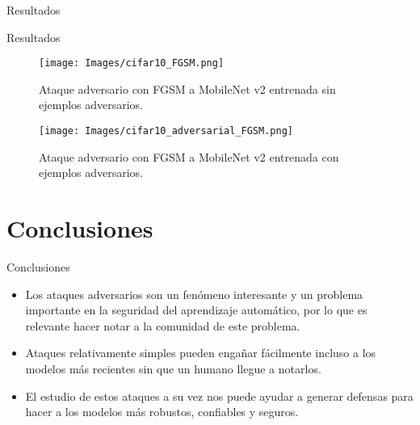 \documentclass[10pt]{beamer}
\begin{document}
\begin{frame}{Resultados}
\end{frame}

\begin{frame}{Resultados}
\justify	
\small

\begin{figure}[H]
\centering
\texttt{[image: Images/cifar10\_FGSM.png]}
\caption{Ataque adversario con FGSM a MobileNet v2 entrenada sin ejemplos adversarios.}
\end{figure}

\begin{figure}[H]
\centering
\texttt{[image: Images/cifar10\_adversarial\_FGSM.png]}
\caption{Ataque adversario con FGSM a MobileNet v2 entrenada con ejemplos adversarios.}
\end{figure}

\end{frame}

\section{Conclusiones}
\begin{frame}{Conclusiones}
\justify	
\small

\begin{itemize}
\item Los ataques adversarios son un fenómeno interesante y un problema importante en la seguridad del aprendizaje automático, por lo que es relevante hacer notar a la comunidad de este problema.

\item Ataques relativamente simples pueden engañar fácilmente incluso a los modelos más recientes sin que un humano llegue a notarlos.

\item El estudio de estos ataques a su vez nos puede ayudar a generar defensas para hacer a los modelos más robustos, confiables y seguros.
\end{itemize}

\end{frame}

%
%
%
%
\end{document}
